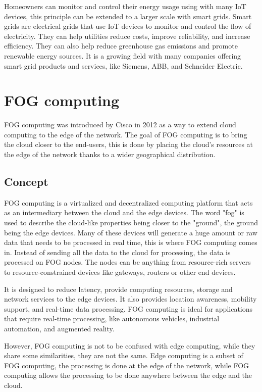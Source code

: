 Homeowners can monitor and control their energy usage using with many IoT devices, this principle can be extended to a larger
scale with smart grids. Smart grids are electrical grids that use IoT devices to monitor and control the flow of electricity.
They can help utilities reduce costs, improve reliability, and increase efficiency. They can also help reduce greenhouse gas
emissions and promote renewable energy sources. It is a growing field with many companies offering smart grid products and
services, like Siemens, ABB, and Schneider Electric.

\chapter{FOG computing}
\label{chap:fog}

FOG computing was introduced by Cisco in 2012 as a way to extend cloud computing to the edge of the network. The goal
of FOG computing is to bring the cloud closer to the end-users, this is done by placing the cloud's resources at the
edge of the network thanks to a wider geographical distribution.

\section{Concept}
\label{sec:fog-concept}

FOG computing is a virtualized and decentralized computing platform that acts as an intermediary between the cloud and
the edge devices. The word "fog" is used to describe the cloud-like properties being closer to the "ground", the ground
being the edge devices. Many of these devices will generate a huge amount or raw data that needs to be processed in real
time, this is where FOG computing comes in. Instead of sending all the data to the cloud for processing, the data is
processed on FOG nodes. The nodes can be anything from resource-rich servers to resource-constrained devices like
gateways, routers or other end devices.

It is designed to reduce latency, provide computing resources, storage and network services to the edge devices. It also
provides location awareness, mobility support, and real-time data processing. FOG computing is ideal for applications that
require real-time processing, like autonomous vehicles, industrial automation, and augmented reality.

However, FOG computing is not to be confused with edge computing, while they share some similarities, they are not the
same. Edge computing is a subset of FOG computing, the processing is done at the edge of the network, while FOG computing
allows the processing to be done anywhere between the edge and the cloud.

